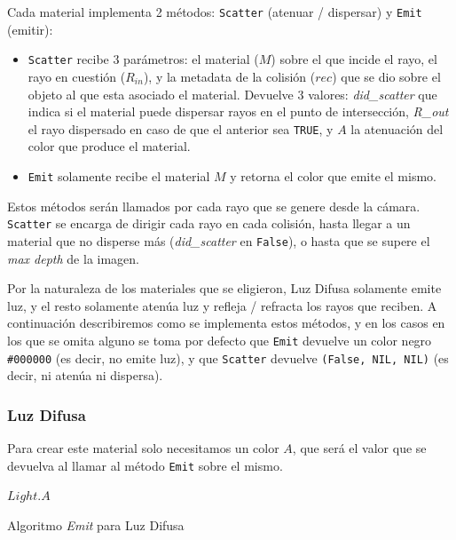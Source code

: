 Cada material implementa 2 métodos: \texttt{Scatter} (atenuar / dispersar) y
\texttt{Emit} (emitir):

\begin{itemize}
    \item \texttt{Scatter} recibe 3 parámetros: el material ($M$) sobre el que
        incide el rayo, el rayo en cuestión ($R_{in}$), y la metadata de la
        colisión ($rec$) que se dio sobre el objeto al que esta asociado el
        material. Devuelve 3 valores: \textit{did\_scatter} que indica si el
        material puede dispersar rayos en el punto de intersección,
        \textit{R\_{out}} el rayo dispersado en caso de que el anterior sea
        \texttt{TRUE}, y $A$ la atenuación del color que produce el material.
    \item \texttt{Emit} solamente recibe el material $M$ y retorna el color que
        emite el mismo.
\end{itemize}

Estos métodos serán llamados por cada rayo que se genere desde la cámara.
\texttt{Scatter} se encarga de dirigir cada rayo en cada colisión, hasta llegar
a un material que no disperse más (\textit{did\_scatter} en \texttt{False}), o
hasta que se supere el \textit{max depth} de la imagen.

Por la naturaleza de los materiales que se eligieron, Luz Difusa solamente emite
luz, y el resto solamente atenúa luz  y refleja / refracta los rayos que
reciben. A continuación describiremos como se implementa estos métodos, y en los
casos en los que se omita alguno se toma por defecto que \texttt{Emit} devuelve
un color negro \texttt{\#000000} (es decir, no emite luz), y que
\texttt{Scatter} devuelve \texttt{(False, NIL, NIL)} (es decir, ni atenúa ni
dispersa).

\subsubsection{Luz Difusa}

Para crear este material solo necesitamos un color $A$, que será el valor que se
devuelva al llamar al método \texttt{Emit} sobre el mismo.

\begin{algorithm}[H]
\begin{algorithmic}[1]
    \State \Return $Light.A$
\EndFunction
\end{algorithmic}
\caption{Algoritmo \textit{Emit} para Luz Difusa}
\label{alg:diffuse-light-emit}
\end{algorithm}

